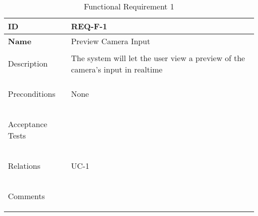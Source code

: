 \begin{table}[H]
    \begin{tabular}[t]{ | >{\bfseries}l | p{9.5cm} |}

    \hline
    ID
    &  REQ-F-1 \\ \hline

    Name
    & Preview Camera Input \\ \hline

    Description
    &  The system will let the user view a preview of the camera's input in realtime \\ \hline

    Preconditions
    & None \\ \hline

    Acceptance Tests
    & \\ \hline

    Relations
    & UC-1 \\ \hline

    Comments
    &  \\ \hline

    \end{tabular}

    \caption{Functional Requirement 1}
    \label{fig:req_f_1}

\end{table}